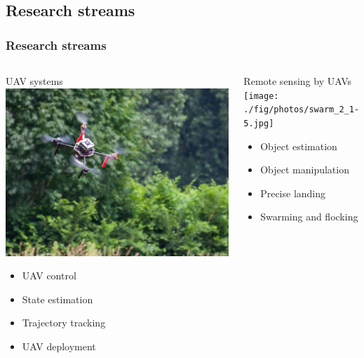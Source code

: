 \documentclass[aspectratio=169]{beamer}
\begin{document}
\subsection{Research streams}


\begin{frame}
\frametitle{Research streams}

\begin{columns}[c]


\begin{block}{UAV systems}
  \includegraphics[width=1.0\textwidth]{./fig/drona.jpg}
  \begin{itemize}
    \item UAV control
    \item State estimation
    \item Trajectory tracking
    \item UAV deployment
  \end{itemize}
\end{block}


\begin{block}{Remote sensing by UAVs}
  \texttt{[image: ./fig/photos/swarm\_2\_1-5.jpg]}
  \begin{itemize}
    \item Object estimation
    \item Object manipulation
    \item Precise landing
    \item Swarming and flocking
  \end{itemize}
\end{block}


\end{columns}
\end{frame}
\end{document}
